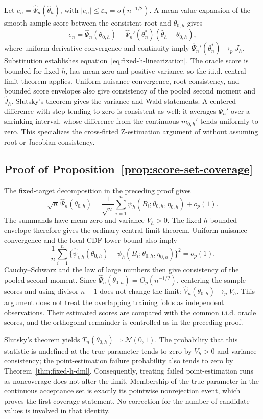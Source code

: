 Let $e_n=\widehat\Psi_n(\widehat\theta_h)$, with
$|e_n|\leq\varepsilon_n=o(n^{-1/2})$. A mean-value expansion of the smooth
sample score between the consistent root and $\theta_{0,h}$ gives
\begin{equation}
e_n=\widehat\Psi_n(\theta_{0,h})
+\widehat\Psi_n'(\theta_n^*)
(\widehat\theta_h-\theta_{0,h}),
\end{equation}
where uniform derivative convergence and continuity imply
$\widehat\Psi_n'(\theta_n^*)\to_pJ_h$. Substitution establishes
equation~\eqref{eq:fixed-h-linearization}. The oracle score is bounded for
fixed $h$, has mean zero and positive variance, so the i.i.d. central limit
theorem applies. Uniform nuisance convergence, root consistency, and bounded
score envelopes also give consistency of the pooled second moment and
$\widehat J_h$. Slutsky's theorem gives the variance and Wald statements.
A centered difference with step tending to zero is consistent as well:
it averages $\widehat\Psi_n'$ over a shrinking interval, whose difference
from the continuous $m_{0,h}'$ tends uniformly to zero.
This specializes the cross-fitted Z-estimation argument of
\citet{chernozhukov2018} without assuming root or Jacobian consistency.

\subsection{Proof of Proposition~\ref{prop:score-set-coverage}}
\label{app:score-set-proof}

The fixed-target decomposition in the preceding proof gives
\[
\sqrt n\,\widehat\Psi_n(\theta_{0,h})
=\frac{1}{\sqrt n}\sum_{i=1}^n
\psi_h(B_i;\theta_{0,h},\eta_{0,h})+o_p(1).
\]
The summands have mean zero and variance $V_h>0$. The fixed-$h$ bounded
envelope therefore gives the ordinary central limit theorem. Uniform
nuisance convergence and the local CDF lower bound also imply
\[
\frac1n\sum_{i=1}^n
\{\widehat\psi_{i,h}(\theta_{0,h})
-\psi_h(B_i;\theta_{0,h},\eta_{0,h})\}^2=o_p(1).
\]
Cauchy--Schwarz and the law of large numbers then give consistency of the
pooled second moment. Since
$\widehat\Psi_n(\theta_{0,h})=O_p(n^{-1/2})$, centering the sample scores
and using divisor $n-1$ does not change the limit:
$\widehat V_n(\theta_{0,h})\to_pV_h$. This argument does not treat the
overlapping training folds as independent observations. Their estimated
scores are compared with the common i.i.d. oracle scores, and the orthogonal
remainder is controlled as in the preceding proof.

Slutsky's theorem yields
$T_n(\theta_{0,h})\Rightarrow\mathcal N(0,1)$. The probability that this
statistic is undefined at the true parameter tends to zero by $V_h>0$ and
variance consistency; the point-estimation failure probability also tends to
zero by Theorem~\ref{thm:fixed-h-dml}. Consequently, treating failed
point-estimation runs as noncoverage does not alter the limit. Membership of
the true parameter in the continuous acceptance set is exactly its pointwise
nonrejection event, which proves the first coverage statement. No correction
for the number of candidate values is involved in that identity.

